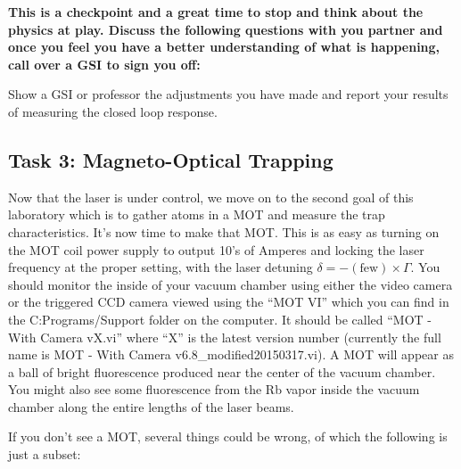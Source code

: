 \documentclass{../lab}
\begin{document}
\textbf{This is a checkpoint and a great time to stop and think about the physics at play. Discuss the following questions with you partner and once you feel you have a better understanding of what is happening, call over a GSI to sign you off:}

Show a GSI or professor the adjustments you have made and report your results of measuring the closed loop response.

\subsection{Task 3: Magneto-Optical Trapping}

Now that the laser is under control, we move on to the second goal of this laboratory which is to gather atoms in a MOT and measure the trap characteristics. It's now time to make that MOT. This is as easy as turning on the MOT coil power supply to output 10's of Amperes and locking the laser frequency at the proper setting, with the laser detuning $\delta = - (\text{few}) \times \Gamma $. You should monitor the inside of your vacuum chamber using either the video camera or the triggered CCD camera viewed using the ``MOT VI'' which you can find in the C:Programs/Support folder on the computer. It should be called ``MOT - With Camera vX.vi'' where ``X'' is the latest version number (currently the full name is MOT - With Camera v6.8\_modified20150317.vi). A MOT will appear as a ball of bright fluorescence produced near the center of the vacuum chamber. You might also see some fluorescence from the Rb vapor inside the vacuum chamber along the entire lengths of the laser beams.

If you don't see a MOT, several things could be wrong, of which the following is just a subset:
\end{document}
